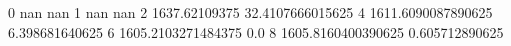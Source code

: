 0 nan nan
1 nan nan
2 1637.62109375 32.4107666015625
4 1611.6090087890625 6.398681640625
6 1605.2103271484375 0.0
8 1605.8160400390625 0.605712890625
